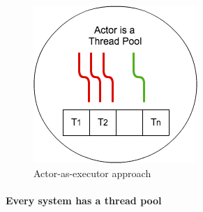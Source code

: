 \begin{figure}
	\label{atp}
	\centering
	\includegraphics[scale=0.7]{atp.png}
	\caption{Actor-as-executor approach}
\end{figure}

\paragraph{Every system has a thread pool}
